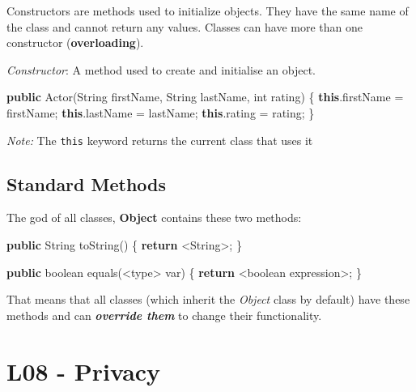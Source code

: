 \documentclass[]{article}
\newenvironment{Shaded}{}{}
\newcommand{\BuiltInTok}[1]{#1}
\newcommand{\DataTypeTok}[1]{\textcolor[rgb]{0.56,0.13,0.00}{#1}}
\newcommand{\FunctionTok}[1]{\textcolor[rgb]{0.02,0.16,0.49}{#1}}
\newcommand{\KeywordTok}[1]{\textcolor[rgb]{0.00,0.44,0.13}{\textbf{#1}}}
\newcommand{\NormalTok}[1]{#1}
\begin{document}
Constructors are methods used to initialize objects. They have the same
name of the class and cannot return any values. Classes can have more
than one constructor (\textbf{overloading}).

\emph{Constructor}: A method used to create and initialise an object.

\begin{Shaded}
\begin{Highlighting}[]
\KeywordTok{public} \FunctionTok{Actor}\NormalTok{(}\BuiltInTok{String}\NormalTok{ firstName, }\BuiltInTok{String}\NormalTok{ lastName, }\DataTypeTok{int}\NormalTok{ rating) \{}
    \KeywordTok{this}\NormalTok{.}\FunctionTok{firstName}\NormalTok{ = firstName;}
    \KeywordTok{this}\NormalTok{.}\FunctionTok{lastName}\NormalTok{ = lastName;}
    \KeywordTok{this}\NormalTok{.}\FunctionTok{rating}\NormalTok{ = rating;}
\NormalTok{\}}
\end{Highlighting}
\end{Shaded}

\emph{Note:} The \texttt{this} keyword returns the current class that
uses it

\hypertarget{standard-methods}{%
\subsection{Standard Methods}\label{standard-methods}}

The god of all classes, \textbf{Object} contains these two methods:

\begin{Shaded}
\begin{Highlighting}[]
\KeywordTok{public} \BuiltInTok{String} \FunctionTok{toString}\NormalTok{() \{}
    \KeywordTok{return}\NormalTok{ <}\BuiltInTok{String}\NormalTok{>;}
\NormalTok{\}}

\KeywordTok{public} \DataTypeTok{boolean} \FunctionTok{equals}\NormalTok{(<type> var) \{}
    \KeywordTok{return}\NormalTok{ <}\DataTypeTok{boolean}\NormalTok{ expression>;}
\NormalTok{\}}
\end{Highlighting}
\end{Shaded}

That means that all classes (which inherit the \emph{Object} class by
default) have these methods and can \textbf{\emph{override them}} to
change their functionality.

\hypertarget{l08---privacy}{%
\section{L08 - Privacy}\label{l08---privacy}}
\end{document}

